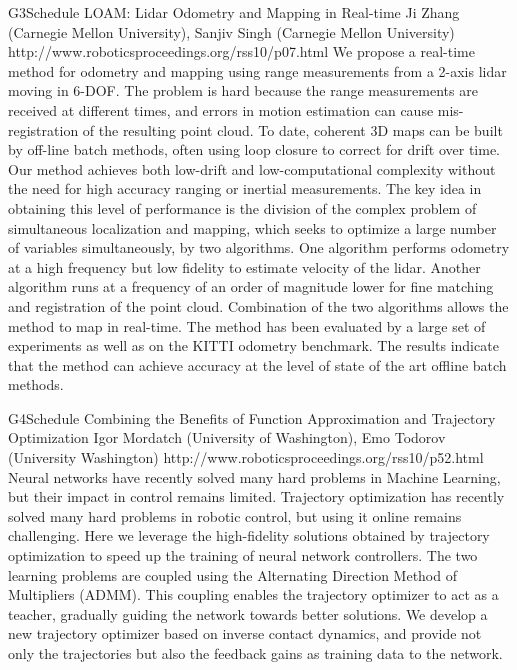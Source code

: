 \begin{spacing}{1.0}
\descriptionPaper
{G3}{Schedule}
{	
LOAM: Lidar Odometry and Mapping in Real-time
}
{
Ji Zhang (Carnegie Mellon University), Sanjiv Singh (Carnegie Mellon University)
}
{
http://www.roboticsproceedings.org/rss10/p07.html
}
{
We propose a real-time method for odometry and mapping using range measurements from a 2-axis lidar moving in 6-DOF. The problem is hard because the range measurements are received at different times, and errors in motion estimation can cause mis-registration of the resulting point cloud. To date, coherent 3D maps can be built by off-line batch methods, often using loop closure to correct for drift over time. Our method achieves both low-drift and low-computational complexity without the need for high accuracy ranging or inertial measurements. The key idea in obtaining this level of performance is the division of the complex problem of simultaneous localization and mapping, which seeks to optimize a large number of variables simultaneously, by two algorithms. One algorithm performs odometry at a high frequency but low fidelity to estimate velocity of the lidar. Another algorithm runs at a frequency of an order of magnitude lower for fine matching and registration of the point cloud. Combination of the two algorithms allows the method to map in real-time. The method has been evaluated by a large set of experiments as well as on the KITTI odometry benchmark. The results indicate that the method can achieve accuracy at the level of state of the art offline batch methods.
}




\descriptionPaper
{G4}{Schedule}
{	
Combining the Benefits of Function Approximation and Trajectory Optimization
}
{
Igor Mordatch (University of Washington), Emo Todorov (University Washington)
}
{
http://www.roboticsproceedings.org/rss10/p52.html
}
{
Neural networks have recently solved many hard problems in Machine Learning, but their impact in control remains limited. Trajectory optimization has recently solved many hard problems in robotic control, but using it online remains challenging. Here we leverage the high-fidelity solutions obtained by trajectory optimization to speed up the training of neural network controllers. The two learning problems are coupled using the Alternating Direction Method of Multipliers (ADMM). This coupling enables the trajectory optimizer to act as a teacher, gradually guiding the network towards better solutions. We develop a new trajectory optimizer based on inverse contact dynamics, and provide not only the trajectories but also the feedback gains as training data to the network.
}



\end{spacing}
